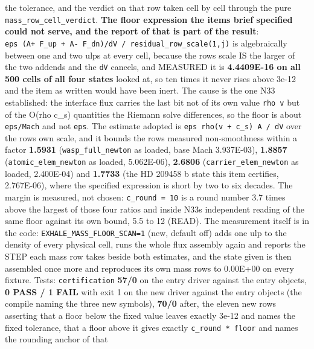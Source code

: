 \documentclass[english,a4paper]{my_memo}
\begin{document}
\begin{itemize}
  the tolerance, and the verdict on that row taken cell by cell through the
  pure \texttt{mass\_row\_cell\_verdict}. \textbf{The floor expression the item\textquotesingle s brief
  specified could not serve, and the report of that is part of the result}:
  \texttt{eps\ (\textbar{}A+\ F\_up\textbar{}\ +\ \textbar{}A-\ F\_dn\textbar{})/dV\ /\ residual\_row\_scale(1,j)} is algebraically
  between one and two ulps at every cell, because the row\textquotesingle s scale IS the larger
  of the two addends and the \texttt{dV} cancels, and MEASURED it is \textbf{4.4409E-16 on
  all 500 cells of all four states} looked at, so ten times it never rises
  above 3e-12 and the item as written would have been inert. The cause is the
  one N33 established: the interface flux carries the last bit not of its own
  value \texttt{rho\ v} but of the O(rho c\_s) quantities the Riemann solve differences,
  so the floor is about \texttt{eps/Mach} and not \texttt{eps}. The estimate adopted is
  \texttt{eps\ rho(\textbar{}v\textbar{}\ +\ c\_s)\ A\ /\ dV} over the row\textquotesingle s own scale, and it bounds the row\textquotesingle s
  measured non-smoothness within a factor \textbf{1.5931} (\texttt{wasp\_full\_newton} as
  loaded, base Mach 3.937E-03), \textbf{1.8857} (\texttt{atomic\_elem\_newton} as loaded,
  5.062E-06), \textbf{2.6806} (\texttt{carrier\_elem\_newton} as loaded, 2.400E-04) and
  \textbf{1.7733} (the HD 209458 b state this item certifies, 2.767E-06), where the
  specified expression is short by two to six decades. The margin is measured,
  not chosen: \texttt{c\_round\ =\ 10} is a round number 3.7 times above the largest of
  those four ratios and inside N33\textquotesingle s independent reading of the same floor
  against its own bound, 5.5 to 12 (READ). The measurement itself is in the
  code: \texttt{EXHALE\_MASS\_FLOOR\_SCAN=1} (new, default off) adds one ulp to the
  density of every physical cell, runs the whole flux assembly again and
  reports the STEP each mass row takes beside both estimates, and the state
  given is then assembled once more and reproduces its own mass rows to
  0.00E+00 on every fixture. Tests: \texttt{certification} \textbf{57/0} on the entry
  driver against the entry objects, \textbf{0 PASS / 1 FAIL} with exit 1 on the new
  driver against the entry objects (the compile naming the three new symbols),
  \textbf{70/0} after, the eleven new rows asserting that a floor below the fixed
  value leaves exactly 3e-12 and names the fixed tolerance, that a floor above
  it gives exactly \texttt{c\_round\ *\ floor} and names the rounding anchor of that

\end{itemize}
\end{document}
